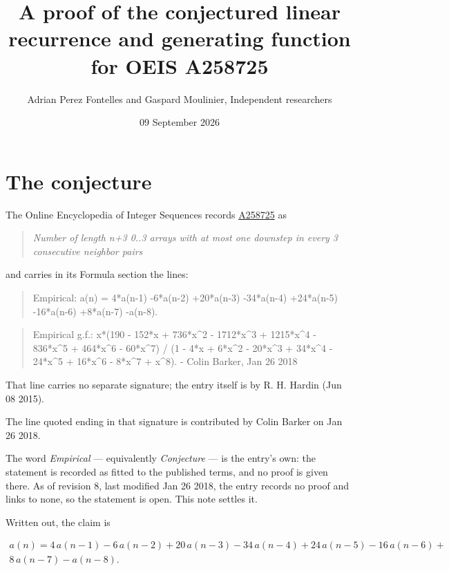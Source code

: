 \documentclass[11pt]{article}
\title{A proof of the conjectured linear recurrence and generating function for OEIS A258725}
\author{Adrian Perez Fontelles and Gaspard Moulinier, Independent researchers}
\date{09 September 2026}
\theoremstyle{definition}
\begin{document}
\maketitle
\section{The conjecture}

The Online Encyclopedia of Integer Sequences records \href{https://oeis.org/A258725}{A258725} as

\begin{quote}\itshape Number of length n+3 0..3 arrays with at most one downstep in every 3 consecutive neighbor pairs\end{quote}

and carries in its Formula section the lines:

\begin{quote}\ttfamily Empirical: a(n) = 4*a(n-1) -6*a(n-2) +20*a(n-3) -34*a(n-4) +24*a(n-5) -16*a(n-6) +8*a(n-7) -a(n-8).\end{quote}

\begin{quote}\ttfamily Empirical g.f.: x*(190 - 152*x + 736*x\textasciicircum{}2 - 1712*x\textasciicircum{}3 + 1215*x\textasciicircum{}4 - 836*x\textasciicircum{}5 + 464*x\textasciicircum{}6 - 60*x\textasciicircum{}7) / (1 - 4*x + 6*x\textasciicircum{}2 - 20*x\textasciicircum{}3 + 34*x\textasciicircum{}4 - 24*x\textasciicircum{}5 + 16*x\textasciicircum{}6 - 8*x\textasciicircum{}7 + x\textasciicircum{}8). - Colin Barker, Jan 26 2018\end{quote}

That line carries no separate signature; the entry itself is by R. H. Hardin (Jun 08 2015).

The line quoted ending in that signature is contributed by Colin Barker on Jan 26 2018.

The word {\itshape Empirical} --- equivalently {\itshape Conjecture} --- is the entry's own: the statement is recorded as fitted to the published terms, and no proof is given there. As of revision 8, last modified Jan 26 2018, the entry records no proof and links to none, so the statement is open. This note settles it.

Written out, the claim is

\begin{multline*} a(n) = 4\,a(n-1) - 6\,a(n-2) + 20\,a(n-3) - 34\,a(n-4) + 24\,a(n-5) - 16\,a(n-6) + \\ 8\,a(n-7) - a(n-8). \end{multline*}
\end{document}
